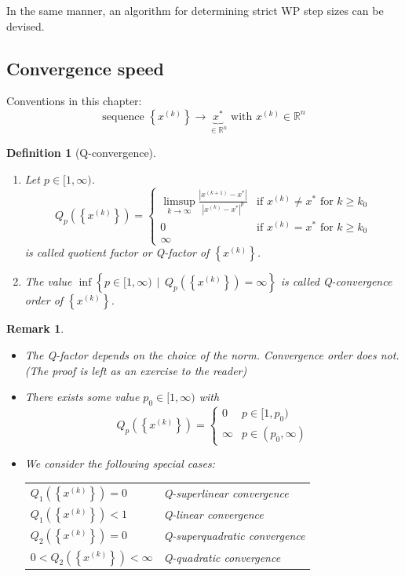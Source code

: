 \documentclass[a4paper]{article}
\numberwithin{lecref}{subsection}
\newtheorem*{Definition}{Definition}
\newtheorem*{Remark}{Remark}
\newcommand{\Abs}[1]{\left|#1\right|}
\newcommand{\Set}[1]{\left\{#1\right\}}
\newcommand{\SetDef}[2]{\left\{#1\,\mid\,#2\right\}}
\begin{document}
In the same manner, an algorithm for determining strict WP step sizes can be devised.

\subsection{Convergence speed}
\label{section:5}

Conventions in this chapter:
\[ \text{sequence } \Set{x^{(k)}} \to \underbrace{x^*}_{\in \mathbb R^n} \text{ with } x^{(k)} \in \mathbb R^n \]

\begin{Definition}[Q-convergence]
	\begin{enumerate}
		\item 
			Let $p \in [1, \infty)$. 
			\[
				Q_p\left(\Set{x^{(k)}}\right) = \begin{cases}
					\limsup_{k \to \infty} \frac{\Abs{x^{(k+1)} - x^*}}{\Abs{x^{(k)} - x^*}^p} & \text{if } x^{(k)} \neq x^* \text{ for } k \geq k_0 \\
					0 & \text{if } x^{(k)} = x^* \text{ for } k \geq k_0 \\
					\infty &
				\end{cases}
			\]
			is called \emph{quotient factor} or \emph{Q-factor} of $\Set{x^{(k)}}$.
		\item The value $\inf\SetDef{p \in [1, \infty)}{Q_p(\Set{x^{(k)}}) = \infty}$ is called \emph{Q-convergence order} of $\Set{x^{(k)}}$.
	\end{enumerate}
\end{Definition}

\begin{Remark}
	\begin{itemize}
		\item The Q-factor depends on the choice of the norm. Convergence order does not. (The proof is left as an exercise to the reader)
		\item There exists some value $p_0 \in [1, \infty)$ with
			\[ Q_p\left(\Set{x^{(k)}}\right) = \begin{cases} 0 & p \in [1, p_0) \\ \infty & p \in (p_0, \infty) \end{cases} \]
		\item We consider the following special cases:
			\begin{center}
				\begin{tabular}{ll}
					$Q_1\left(\Set{x^{(k)}}\right) = 0$ & Q-superlinear convergence \\
					$Q_1\left(\Set{x^{(k)}}\right) < 1$ & Q-linear convergence \\
					$Q_2\left(\Set{x^{(k)}}\right) = 0$ & Q-superquadratic convergence \\
					$0 < Q_2\left(\Set{x^{(k)}}\right) < \infty$ & Q-quadratic convergence
				\end{tabular}
			\end{center}
	\end{itemize}
\end{Remark}
\end{document}
